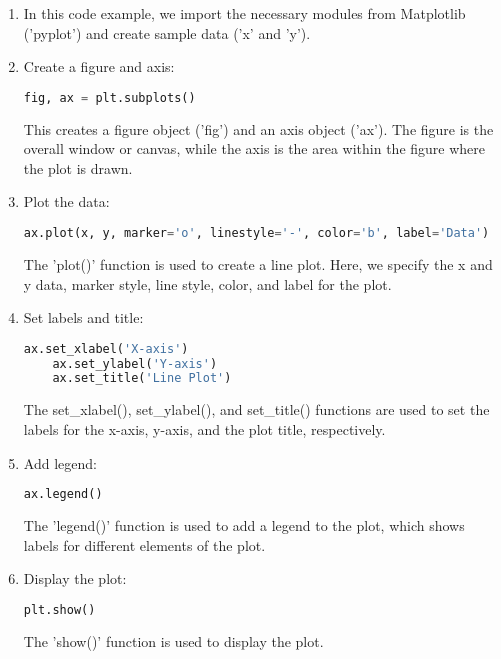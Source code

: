 \begin{enumerate}
	\item In this code example, we import the necessary modules from Matplotlib ('pyplot') and create sample data ('x' and 'y').
	
	\item Create a figure and axis:
\begin{lstlisting}[language=Python, style=pythonstyle, caption={Creating a subplot with Matplotlib}, label={code:subplot}]
	fig, ax = plt.subplots()
\end{lstlisting}

	
	This creates a figure object ('fig') and an axis object ('ax'). The figure is the overall window or canvas, while the axis is the area within the figure where the plot is drawn.
	
	\item Plot the data:
\begin{lstlisting}[language=Python, style=pythonstyle, caption={Plotting data with a line plot}, label={code:plotdata}]
	ax.plot(x, y, marker='o', linestyle='-', color='b', label='Data')
\end{lstlisting}

	
	The 'plot()' function is used to create a line plot. Here, we specify the x and y data, marker style, line style, color, and label for the plot.
	
	\item Set labels and title:
\begin{lstlisting}[language=Python, style=pythonstyle, caption={Setting labels and title for the plot}, label={code:setlabels}]
	ax.set_xlabel('X-axis')
	ax.set_ylabel('Y-axis')
	ax.set_title('Line Plot')
\end{lstlisting}

	
	The set\_xlabel(), set\_ylabel(), and set\_title() functions are used to set the labels for the x-axis, y-axis, and the plot title, respectively.
	
	\item Add legend:
\begin{lstlisting}[language=Python, style=pythonstyle, caption={Adding legend to the plot}, label={code:addlegend}]
	ax.legend()
\end{lstlisting}

	
	The 'legend()' function is used to add a legend to the plot, which shows labels for different elements of the plot.
	
	\item Display the plot:
\begin{lstlisting}[language=Python, style=pythonstyle, caption={Displaying the plot}, label={code:displayplot}]
	plt.show()
\end{lstlisting}

	
	The 'show()' function is used to display the plot.
	
\end{enumerate}


